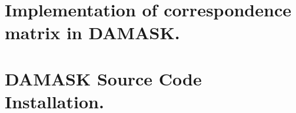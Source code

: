 \documentclass{report}
\begin{document}
\chapter{Implementation of correspondence matrix in DAMASK.}
\label{Appendix:Correspondence_matrix}




\chapter{DAMASK Source Code Installation.}
\label{Appendix:DAMASK_source_code_compilation}




\end{document}
